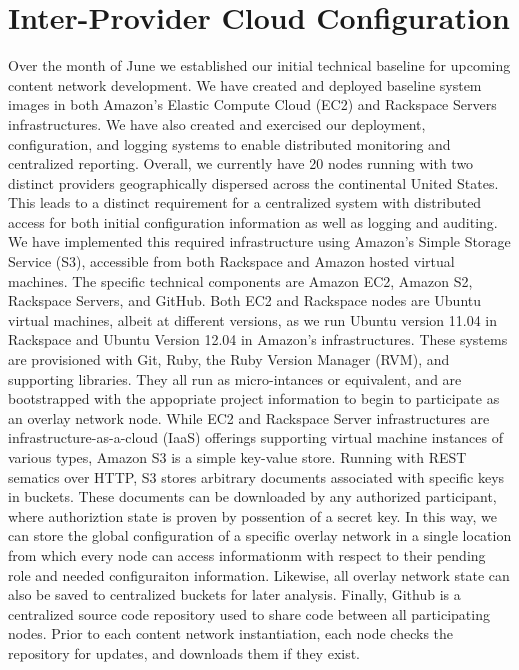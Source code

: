 \section{Inter-Provider Cloud Configuration}
Over the month of June we established our initial technical baseline for upcoming content network development.  We have created and deployed baseline system images in both Amazon's Elastic Compute Cloud (EC2) and Rackspace Servers infrastructures.  We have also created and exercised our deployment, configuration, and logging systems to enable distributed monitoring and centralized reporting.  Overall, we currently have 20 nodes running with two distinct providers geographically dispersed across the continental United States.  This leads to a distinct requirement for a centralized system with distributed access for both initial configuration information as well as logging and auditing.  We have implemented this required infrastructure using Amazon's Simple Storage Service (S3), accessible from both Rackspace and Amazon hosted virtual machines.
The specific technical components are Amazon EC2, Amazon S2, Rackspace Servers, and GitHub.  Both EC2 and Rackspace nodes are Ubuntu virtual machines, albeit at different versions, as we run Ubuntu version 11.04 in Rackspace and Ubuntu Version 12.04 in Amazon's infrastructures.  These systems are provisioned with Git, Ruby, the Ruby Version Manager (RVM), and supporting libraries.  They all run as micro-intances or equivalent, and are bootstrapped with the appopriate project information to begin to participate as an overlay network node.  While EC2 and Rackspace Server infrastructures are infrastructure-as-a-cloud (IaaS) offerings supporting virtual machine instances of various types, Amazon S3 is a simple key-value store.  Running with REST sematics over HTTP, S3 stores arbitrary documents associated with specific keys in buckets.  These documents can be downloaded by any authorized participant, where authoriztion state is proven by possention of a secret key.  In this way, we can store the global configuration of a specific overlay network in a single location from which every node can access informationm with respect to their pending role and needed configuraiton information.  Likewise, all overlay network state can also be saved to centralized buckets for later analysis.  Finally, Github is a centralized source code repository used to share code between all participating nodes.  Prior to each content network instantiation, each node checks the repository for updates, and downloads them if they exist.

